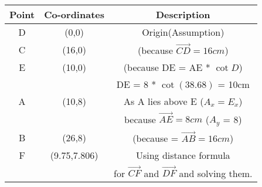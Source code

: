 \begin{tabular}{|c|c|c|}
\hline
Point & Co-ordinates & Description\\
\hline
D & (0,0) & Origin(Assumption) \\
\hline
C & (16,0) & (because $\vec{CD} = 16cm$)\\
\hline
E & (10,0) & (because DE = AE * $\cot{D}$)\\
 & & DE = 8 * $\cot(38.68)$ = 10cm \\
\hline
A & (10,8) & As A lies above E ($A_x = E_x$)\\
	& & because $\vec{AE} = 8cm$ ($A_y$ = 8)\\
\hline
B & (26,8) & (because = $\vec{AB} = 16cm$)\\
\hline
F & (9.75,7.806) & Using distance formula\\
	& & for $\vec{CF}$ and $\vec{DF}$ and solving them.\\
\hline
\end{tabular}
